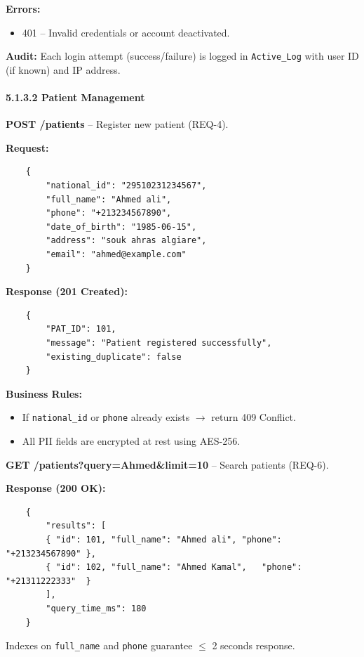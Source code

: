 \textbf{Errors:}
\begin{itemize}
	\item 401 – Invalid credentials or account deactivated.
\end{itemize}

\textbf{Audit:} Each login attempt (success/failure) is logged in \texttt{Active\_Log} with user ID (if known) and IP address.

\paragraph{5.1.3.2 \quad Patient Management}

\textbf{POST /patients} – Register new patient (REQ-4).

\textbf{Request:}
\begin{verbatim}
	{
		"national_id": "29510231234567",
		"full_name": "Ahmed ali",
		"phone": "+213234567890",
		"date_of_birth": "1985-06-15",
		"address": "souk ahras algiare",
		"email": "ahmed@example.com"
	}
\end{verbatim}

\textbf{Response (201 Created):}
\begin{verbatim}
	{
		"PAT_ID": 101,
		"message": "Patient registered successfully",
		"existing_duplicate": false
	}
\end{verbatim}

\textbf{Business Rules:}
\begin{itemize}
	\item If \texttt{national\_id} or \texttt{phone} already exists $\rightarrow$ return 409 Conflict.
	\item All PII fields are encrypted at rest using AES-256.
\end{itemize}

\medskip
\textbf{GET /patients?query=Ahmed\&limit=10} – Search patients (REQ-6).

\textbf{Response (200 OK):}
\begin{verbatim}
	{
		"results": [
		{ "id": 101, "full_name": "Ahmed ali", "phone": "+213234567890" },
		{ "id": 102, "full_name": "Ahmed Kamal",   "phone": "+21311222333"  }
		],
		"query_time_ms": 180
	}
\end{verbatim}

Indexes on \texttt{full\_name} and \texttt{phone} guarantee $\leq$ 2 seconds response.

